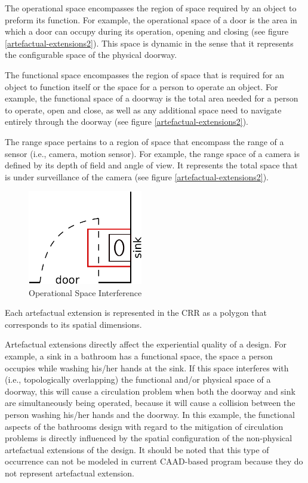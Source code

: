 \documentclass[12pt]{ucthesis}
\begin{document}
The operational space encompasses the region of space required by an object to preform its function. For example, the operational space of a door is the area in which a door can occupy during its operation, opening and closing (see figure \ref{artefactual-extensions2}). This space is dynamic in the sense that it represents the configurable space of the physical doorway. 

The functional space encompasses the region of space that is required for an object to function itself or the space for a person to operate an object. For example, the functional space of a doorway is the total area needed for a person to operate, open and close, as well as any additional space need to navigate entirely through the doorway (see figure \ref{artefactual-extensions2}).

The range space pertains to a region of space that encompass the range of a sensor (i.e., camera, motion sensor). For example, the range space of a camera is defined by its depth of field and angle of view. It represents the total space that is under surveillance of the camera (see figure \ref{artefactual-extensions2}).

\begin{figure}[H]
\centering
\includegraphics[width=50mm]{door-sink}
\caption{Operational Space Interference}
\label{door-sink}
\end{figure}

Each artefactual extension is represented in the CRR as a polygon that corresponds to its spatial dimensions.

Artefactual extensions directly affect the experiential quality of a design. For example, a sink in a bathroom has a functional space, the space a person occupies while washing his/her hands at the sink. If this space interferes with (i.e., topologically overlapping) the functional and/or physical space of a doorway, this will cause a circulation problem when both the doorway and sink are simultaneously being operated, because it will cause a collision between the person washing his/her hands and the doorway. In this example, the functional aspects of the bathrooms design with regard to the mitigation of circulation problems is directly influenced by the spatial configuration of the non-physical artefactual extensions of the design. It should be noted that this type of occurrence can not be modeled in current CAAD-based program because they do not represent artefactual extension.
\end{document}
